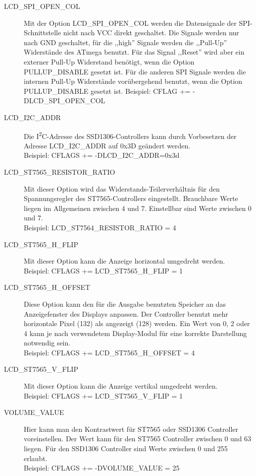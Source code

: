\begin{description}
  \item[LCD\_SPI\_OPEN\_COL] Mit der Option LCD\_SPI\_OPEN\_COL werden die Datensignale der SPI-Schnittstelle
nicht nach VCC direkt geschaltet.
Die Signale werden nur nach GND geschaltet, für die ,,high'' Signale werden die ,,Pull-Up'' Widerstände
des ATmega benutzt.
Für das Signal ,,Reset'' wird aber ein externer Pull-Up Widerstand benötigt, wenn die Option PULLUP\_DISABLE
gesetzt ist. Für die anderen SPI Signale werden die internen Pull-Up Widerstände vorübergehend benutzt,
wenn die Option PULLUP\_DISABLE gesetzt ist.
Beispiel: CFLAG += -DLCD\_SPI\_OPEN\_COL

 \item[LCD\_I2C\_ADDR] Die I\textsuperscript{2}C-Adresse des SSD1306-Controllers kann durch Vorbesetzen der Adresse LCD\_I2C\_ADDR
auf 0x3D geändert werden.\\
Beispiel: CFLAGS += -DLCD\_I2C\_ADDR=0x3d

  \item[LCD\_ST7565\_RESISTOR\_RATIO] Mit dieser Option wird das Widerstands-Teilerverhältnis für den
Spannungsregler des ST7565-Controllers eingestellt. Brauchbare Werte liegen im Allgemeinen zwischen 4 und 7.
Einstellbar sind Werte zwischen 0 und 7.\\
Beispiel: LCD\_ST7564\_RESISTOR\_RATIO = 4

  \item[LCD\_ST7565\_H\_FLIP] Mit dieser Option kann die Anzeige horizontal umgedreht werden.\\
Beispiel: CFLAGS += LCD\_ST7565\_H\_FLIP = 1

  \item[LCD\_ST7565\_H\_OFFSET] Diese Option kann den für die Ausgabe benutzten Speicher an das Anzeigefenster des
 Displays anpassen. Der Controller benutzt mehr horizontale Pixel (132) als angezeigt (128) werden.
 Ein Wert von 0, 2 oder 4 kann je nach verwendetem Display-Modul für eine korrekte Darstellung notwendig sein.\\
Beispiel: CFLAGS += LCD\_ST7565\_H\_OFFSET = 4

  \item[LCD\_ST7565\_V\_FLIP] Mit dieser Option kann die Anzeige vertikal umgedreht werden.\\
Beispiel: CFLAGS += LCD\_ST7565\_V\_FLIP = 1

  \item[VOLUME\_VALUE] Hier kann man den Kontrastwert für ST7565 oder SSD1306 Controller voreinstellen.
Der Wert kann für den ST7565 Controller zwischen 0 und 63 liegen.
Für den SSD1306 Controller sind Werte zwischen 0 und 255 erlaubt.\\
Beispiel: CFLAGS += -DVOLUME\_VALUE = 25


\end{description}
